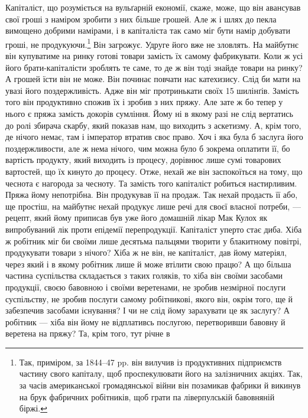 Капіталіст, що розуміється на вульґарній економії, скаже,
може, що він авансував свої гроші з наміром зробити з них більше
грошей. Але ж і шлях до пекла вимощено добрими намірами, і в
капіталіста так само міг бути намір добувати гроші, не продукуючи.\footnote{
Так, приміром, за 1844--47 pp. він вилучив із продуктивних підприємств
частину свого капіталу, щоб проспекулювати його на залізничних
акціях. Так, за часів американської громадянської війни він позамикав
фабрики й викинув на брук фабричних робітників, щоб грати па ліверпулській
бавовняній біржі.
} Він загрожує. Удруге його вже
не зловлять. На майбутнє
він купуватиме на ринку готові товари замість їх самому
фабрикувати. Коли ж усі його брати-капіталісти зроблять те
саме, то де ж він тоді знайде товари на ринку? А грошей їсти
він не може. Він починає повчати нас катехизису. Слід би мати
на увазі його поздержливість. Адже він міг протринькати своїх
15 шилінґів. Замість того він продуктивно спожив їх і зробив
з них пряжу. Але зате ж бо тепер у нього є пряжа замість докорів
сумління. Йому ні в якому разі не слід вертатись до ролі
збирача скарбу, який показав нам, що виходить з аскетизму.
А, крім того, де нічого немає, там і імператор втратив своє право.
Хоч і яка була б заслуга його поздержливости, але ж нема нічого,
чим можна було б зокрема оплатити її, бо вартість продукту,
який виходить із процесу, дорівнює лише сумі товарових вартостей,
що їх кинуто до процесу. Отже, нехай же він заспокоїться
на тому, що чеснота є нагорода за чесноту. Та замість того капіталіст
робиться настирливим. Пряжа йому непотрібна. Він продукував
її на продаж. Так нехай продасть її або, ще простіш, на
майбутнє нехай продукує лише речі для своєї власної потреби, —
рецепт, який йому приписав був уже його домашній лікар Мак
Кулох як випробуваний лік проти епідемії перепродукції. Капіталіст
уперто стає диба. Хіба ж робітник міг би своїми лише
десятьма пальцями творити у блакитному повітрі, продукувати
товари з нічого? Хіба ж не він, не капіталіст, дав йому матеріял,
через який і в якому робітник лише й може втілити свою працю?
А що більша частина суспільства складається з таких голяків,
то хіба він своїми засобами продукції, своєю бавовною і своїми
веретенами, не зробив незмірної послуги суспільству, не зробив
послуги самому робітникові, якого він, окрім того, ще й забезпечив
засобами існування? І чи не слід йому зарахувати це як заслугу?
А робітник — хіба він йому не відплативсь послугою, перетворивши
бавовну й веретена на пряжу? Та, крім того, тут річне в
